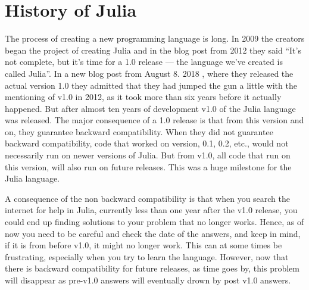 \section{History of Julia}
The process of creating a new programming language is long. In 2009 the creators began the project of creating Julia and in the blog post \emph{\citep{juliaBlogRelease2012}} from 2012 they said \enquote{It's not complete, but it's time for a 1.0 release — the language we’ve created is called Julia}. In a new blog post from August 8. 2018 \emph{\citep{juliaBlogReleaseV1.0}}, where they released the actual version 1.0 they admitted that they had jumped the gun a little with the mentioning of v1.0 in 2012, as it took more than six years before it actually happened. But after almost ten years of development v1.0 of the Julia language was released. The major consequence of a 1.0 release is that from this version and on, they guarantee backward compatibility. When they did not guarantee backward compatibility, code that worked on version, 0.1, 0.2, etc., would not necessarily run on newer versions of Julia. But from v1.0, all code that run on this version, will also run on future releases. This was a huge milestone for the Julia language. 

A consequence of the non backward compatibility is that when you search the internet for help in Julia, currently less than one year after the v1.0 release, you could end up finding solutions to your problem that no longer works. Hence, as of now you need to be careful and check the date of the answers, and keep in mind, if it is from before v1.0, it might no longer work. This can at some times be frustrating, especially when you try to learn the language. However, now that there is backward compatibility for future releases, as time goes by, this problem will disappear as pre-v1.0 answers will eventually drown by post v1.0 answers.

